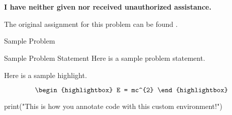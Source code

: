 \clearpage
\chapter{\documentNumber}

\section{\documentName}


\begin{center}
    \Large{\textbf{I have neither given nor received unauthorized assistance.}}
    \large{\textbf{\authorName}}
\end{center}

\noindent The original assignment for this problem can be found .

\begin{problem}{Sample Problem}
    \begin{statement}{Sample Problem Statement}
        Here is a sample problem statement.
    \end{statement}

    \begin{highlight}
        Here is a sample highlight.

        \begin{equation*}
            \begin{highlightbox}
                E = mc^{2}
            \end{highlightbox}
        \end{equation*}
    \begin{code}[Python]
    print("This is how you annotate code with this custom environment!")
    \end{code}
    \end{highlight}
\end{problem}